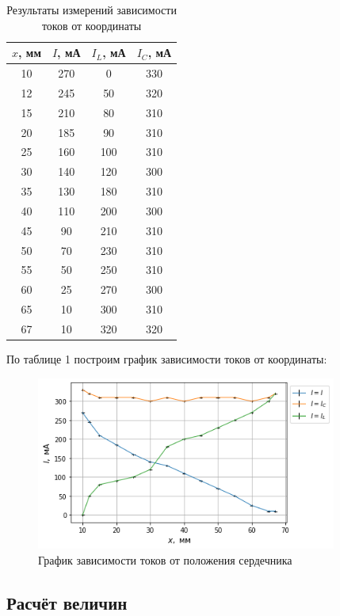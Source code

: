 \documentclass[a4paper]{article}
\theoremstyle{definition}
\theoremstyle{remark}
\begin{document}
\begin{table}[h!]
    \centering
    \caption{Результаты измерений зависимости токов от координаты}
    \begin{tabular}{|c|c|c|c|}
    \hline
    \rowcolor[HTML]{FFFFFF}
    \textbf{$x$, мм} & \textbf{$I$, мА} & \textbf{$I_L$, мА} & \textbf{$I_C$, мА} \\ \hline
    10 & 270 & 0 & 330 \\ \hline
    12 & 245 & 50 & 320 \\ \hline
    15 & 210 & 80 & 310 \\ \hline
    20 & 185 & 90 & 310 \\ \hline
    25 & 160 & 100 & 310 \\ \hline
    30 & 140 & 120 & 300 \\ \hline
    35 & 130 & 180 & 310 \\ \hline
    40 & 110 & 200 & 300 \\ \hline
    45 & 90 & 210 & 310 \\ \hline
    50 & 70 & 230 & 310 \\ \hline
    55 & 50 & 250 & 310 \\ \hline
    60 & 25 & 270 & 300 \\ \hline
    65 & 10 & 300 & 310 \\ \hline
    67 & 10 & 320 & 320 \\ \hline
    \end{tabular}
    \end{table}

По таблице 1 построим график зависимости токов от координаты:

\begin{figure}[h!]
    \centering
    \includegraphics[width = 280pt]{image/graph1.png}
    \caption{График зависимости токов от положения сердечника}
\end{figure}

\subsection{Расчёт величин}
\end{document}
